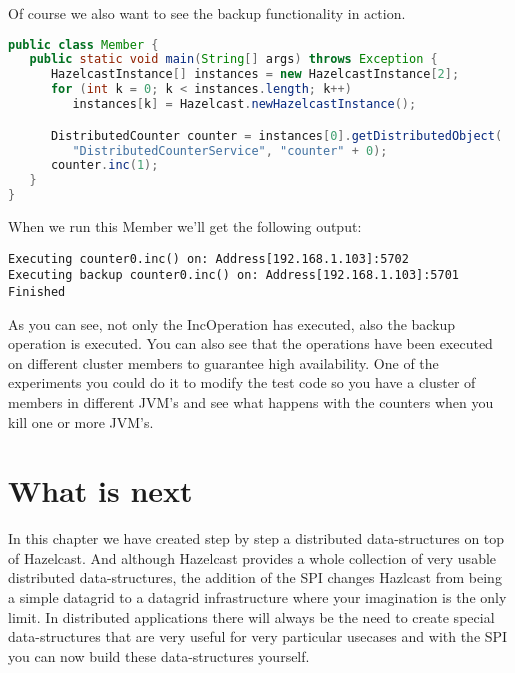Of course we also want to see the backup functionality in action.
\begin{lstlisting}[language=java]
public class Member {
   public static void main(String[] args) throws Exception {
      HazelcastInstance[] instances = new HazelcastInstance[2];
      for (int k = 0; k < instances.length; k++) 
         instances[k] = Hazelcast.newHazelcastInstance();

      DistributedCounter counter = instances[0].getDistributedObject(
         "DistributedCounterService", "counter" + 0);
      counter.inc(1);
   }
}
\end{lstlisting}
When we run this Member we'll get the following output:
\begin{lstlisting}
Executing counter0.inc() on: Address[192.168.1.103]:5702
Executing backup counter0.inc() on: Address[192.168.1.103]:5701
Finished
\end{lstlisting}
As you can see, not only the IncOperation has executed, also the backup operation is executed. You can also see that the operations have been executed on different cluster members to guarantee high availability. One of the experiments you could do it to modify the test code so you have a cluster of members in different JVM's and see what happens with the counters when you kill one or more JVM's. 

\section{What is next}
In this chapter we have created step by step a distributed data-structures on top of Hazelcast. And although Hazelcast provides a whole collection of very usable distributed data-structures, the addition of the SPI changes Hazlcast from being a simple datagrid to a datagrid infrastructure where your imagination is the only limit. In distributed applications there will always be the need to create special data-structures that are very useful for very particular usecases and with the SPI you can now build these data-structures yourself.